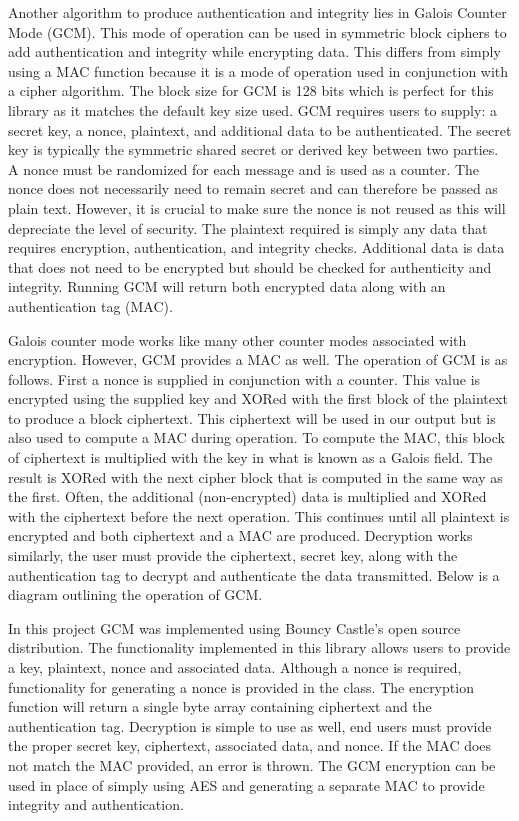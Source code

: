 Another algorithm to produce authentication and integrity lies in Galois Counter Mode (GCM). This mode of operation can be used in symmetric block ciphers to add authentication and integrity while encrypting data. This differs from simply using a MAC function because it is a mode of operation used in conjunction with a cipher algorithm. The block size for GCM is 128 bits which is perfect for this library as it matches the default key size used. GCM requires users to supply: a secret key, a nonce, plaintext, and additional data to be authenticated. The secret key is typically the symmetric shared secret or derived key between two parties. A nonce must be randomized for each message and is used as a counter. The nonce does not necessarily need to remain secret and can therefore be passed as plain text. However, it is crucial to make sure the nonce is not reused as this will depreciate the level of security. The plaintext required is simply any data that requires encryption, authentication, and integrity checks. Additional data is data that does not need to be encrypted but should be checked for authenticity and integrity. Running GCM will return both encrypted data along with an authentication tag (MAC). 

Galois counter mode works like many other counter modes associated with encryption. However, GCM provides a MAC as well. The operation of GCM is as follows. First a nonce is supplied in conjunction with a counter. This value is encrypted using the supplied key and XORed with the first block of the plaintext to produce a block ciphertext. This ciphertext will be used in our output but is also used to compute a MAC during operation. To compute the MAC, this block of ciphertext is multiplied with the key in what is known as a Galois field. The result is XORed with the next cipher block that is computed in the same way as the first. Often, the additional (non-encrypted) data is multiplied and XORed with the ciphertext before the next operation. This continues until all plaintext is encrypted and both ciphertext and a MAC are produced.  Decryption works similarly, the user must provide the ciphertext, secret key,  along with the authentication tag to decrypt and authenticate the data transmitted. Below is a diagram outlining the operation of GCM. 

In this project GCM was implemented using Bouncy Castle's open source distribution. The functionality implemented in this library allows users to provide a key, plaintext, nonce and associated data. Although a nonce is required, functionality for generating a nonce is provided in the class. The encryption function will return a single byte array containing ciphertext and the authentication tag. Decryption is simple to use as well, end users must provide the proper secret key, ciphertext, associated data, and nonce. If the MAC does not match the MAC provided, an error is thrown. The GCM encryption can be used in place of  simply using AES and generating a separate MAC to provide integrity and authentication. 

